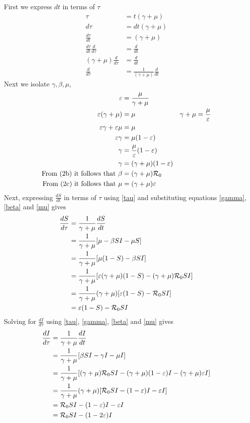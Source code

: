First we express $dt$ in terms of $\tau$
\begin{align}
    \tau &= t(\gamma + \mu)\nonumber\\
    d\tau &= dt(\gamma + \mu)\nonumber\\
    \frac{d\tau}{dt} &= (\gamma + \mu)\nonumber\\
    \frac{d\tau}{dt}\frac{d}{d\tau} &= \frac{d}{dt}\nonumber\\
    (\gamma+\mu)\frac{d}{d\tau} &= \frac{d}{dt}\nonumber\\
    \frac{d}{d\tau} &= \frac{1}{(\gamma+\mu)}\frac{d}{dt}\label{tau}
\end{align}
Next we isolate $\gamma,\beta,\mu$,
\begin{align}
    \varepsilon &= \frac{\mu}{\gamma+\mu}\nonumber\\
    \varepsilon(\gamma + \mu) &= \mu &\gamma+\mu = \frac{\mu}{\varepsilon} \nonumber\\
    \varepsilon \gamma + \varepsilon \mu &= \mu\nonumber\\
    \varepsilon \gamma &= \mu(1-\varepsilon)\nonumber\\
    \gamma &= \frac{\mu}{\varepsilon}(1-\varepsilon)\nonumber\\
    \gamma &= (\gamma+\mu)(1-\varepsilon)\label{gamma}\\
    \textrm{From (2b) it follows that}\ \beta &= (\gamma+\mu){\mathcal R_0}\label{beta}\\
    \textrm{From (2c) it follows that}\ \mu &= (\gamma+\mu)\varepsilon\label{mu}
\end{align}
Next, expressing $\frac{dS}{dt}$ in terms of $\tau$ using \ref{tau} and substituting equations \ref{gamma},\ref{beta} and \ref{mu} gives
\begin{align}
    \frac{dS}{d\tau} &= \frac{1}{\gamma+\mu}\frac{dS}{dt}\nonumber\\
     &= \frac{1}{\gamma+\mu}[\mu-\beta SI -\mu S]\nonumber\\
     &= \frac{1}{\gamma+\mu}[\mu(1-S)-\beta SI]\\
     &= \frac{1}{\gamma+\mu}[\varepsilon(\gamma+\mu)(1-S)- (\gamma+\mu){\mathcal R_0}SI]\nonumber\\
     &= \frac{1}{\gamma+\mu}(\gamma+\mu)[\varepsilon(1-S)- {\mathcal R_0}SI]\nonumber\\
     &= \varepsilon(1-S)- {\mathcal R_0}SI
\end{align}
Solving for $\frac{dI}{d\tau}$ using \ref{tau}, \ref{gamma}, \ref{beta} and \ref{mu} gives
\begin{align}
    \frac{dI}{d\tau} &= \frac{1}{\gamma+\mu}\frac{dI}{dt}\nonumber\\
     &= \frac{1}{\gamma+\mu}[\beta SI -\gamma I-\mu I]\nonumber\\
     &= \frac{1}{\gamma+\mu}[(\gamma+\mu){\mathcal R_0}SI -(\gamma+\mu)(1-\varepsilon) I-(\gamma+\mu)\varepsilon I]\nonumber\\
     &= \frac{1}{\gamma+\mu}(\gamma+\mu)[{\mathcal R_0}SI -(1-\varepsilon) I-\varepsilon I]\nonumber\\
     &= {\mathcal R_0}SI -(1-\varepsilon) I-\varepsilon I\nonumber\\
     &= {\mathcal R_0}SI -(1-2\varepsilon) I
\end{align}
